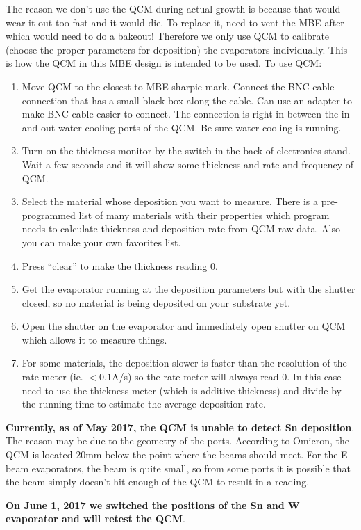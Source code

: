 The reason we don’t use the QCM during actual growth is because that would wear it out too fast and it would die. To replace it, need to vent the MBE after which would need to do a bakeout! Therefore we only use QCM to calibrate (choose the proper parameters for deposition) the evaporators individually. This is how the QCM in this MBE design is intended to be used.
To use QCM:
\begin{enumerate}
\item	Move QCM to the closest to MBE sharpie mark. Connect the BNC cable connection that has a small black box along the cable. Can use an adapter to make BNC cable easier to connect. The connection is right in between the in and out water cooling ports of the QCM. Be sure water cooling is running.
\item	Turn on the thickness monitor by the switch in the back of electronics stand. Wait a few seconds and it will show some thickness and rate and frequency of QCM. 
\item	Select the material whose deposition you want to measure. There is a pre-programmed list of many materials with their properties which program needs to calculate thickness and deposition rate from QCM raw data. Also you can make your own favorites list.
\item	Press “clear” to make the thickness reading 0.
\item	Get the evaporator running at the deposition parameters but with the shutter closed, so no material is being deposited on your substrate yet. 
\item	Open the shutter on the evaporator and immediately open shutter on QCM which allows it to measure things.
\item	For some materials, the deposition slower is faster than the resolution of the rate meter (ie. $<0.1$A/s) so the rate meter will always read 0. In this case need to use the thickness meter (which is additive thickness) and divide by the running time to estimate the average deposition rate.
\end{enumerate}

\textbf{Currently, as of May 2017, the QCM is unable to detect Sn deposition}. The reason may be due to the geometry of the ports. According to Omicron, the QCM is located 20mm below the point where the beams should meet. For the E-beam evaporators, the beam is quite small, so from some ports it is possible that the beam simply doesn't hit enough of the QCM to result in a reading.

\textbf{On June 1, 2017 we switched the positions of the Sn and W evaporator and will retest the QCM}.

